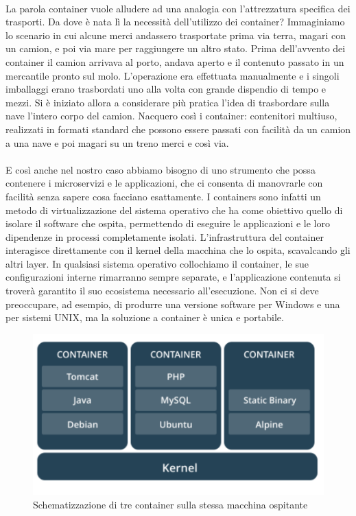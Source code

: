 \paragraph{}
La parola container vuole alludere ad una analogia con l'attrezzatura specifica dei trasporti. Da dove è nata lì la necessità dell'utilizzo dei container? Immaginiamo lo scenario in cui alcune merci andassero trasportate prima via terra, magari con un camion, e poi via mare per raggiungere un altro stato. Prima dell'avvento dei container il camion arrivava al porto, andava aperto e il contenuto passato in un mercantile pronto sul molo. L'operazione era effettuata manualmente e i singoli imballaggi erano trasbordati uno alla volta con grande dispendio di tempo e mezzi. Si è iniziato allora a considerare più pratica l'idea di trasbordare sulla nave l'intero corpo del camion. Nacquero così i container: contenitori multiuso, realizzati in formati standard che possono essere passati con facilità da un camion a una nave e poi magari su un treno merci e così via.

\paragraph{}
E così anche nel nostro caso abbiamo bisogno di uno strumento che possa contenere i microservizi e le applicazioni, che ci consenta di manovrarle con facilità senza sapere cosa facciano esattamente.
I containers sono infatti un metodo di virtualizzazione del sistema operativo che ha come obiettivo quello di isolare il software che ospita, permettendo di eseguire le applicazioni e le loro dipendenze in processi completamente isolati. L'infrastruttura del container interagisce direttamente con il kernel della macchina che lo ospita, scavalcando gli altri layer. In qualsiasi sistema operativo collochiamo il container, le sue configurazioni interne rimarranno sempre separate, e l'applicazione contenuta si troverà garantito il suo ecosistema necessario all'esecuzione. Non ci si deve preoccupare, ad esempio, di produrre una versione software per Windows e una per sistemi UNIX, ma la soluzione a container è unica e portabile. 

\begin{figure}[h!]
	\centering
	\includegraphics[width=\textwidth,keepaspectratio=true]{capitoli/imgs/container.PNG}
	\caption{Schematizzazione di tre container sulla stessa macchina ospitante}
\end{figure}

